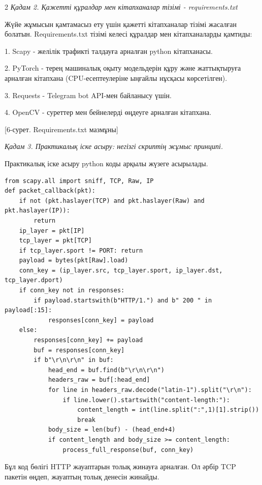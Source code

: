 \begin{multicols}{2}
\emph{Қадам 2. Қажетті құралдар мен кітапханалар тізімі -
requirements.txt}

Жүйе жұмысын қамтамасыз ету үшін қажетті кітапханалар тізімі жасалған
болатын. Requirements.txt тізімі келесі құралдар мен кітапханаларды
қамтиды:

1. Scapy - желілік трафикті талдауға арналған python кітапханасы.

2. PyTorch - терең машиналық оқыту модельдерін құру және жаттықтыруға
арналған кітапхана (CPU-есептеулеріне ыңғайлы нұсқасы көрсетілген).

3. Requests - Telegram bot API-мен байланысу үшін.

4. OpenCV - суреттер мен бейнелерді өңдеуге арналған кітапхана.
\end{multicols}

[6-сурет. Requirements.txt мазмұны]

\emph{Қадам 3. Практикалық іске асыру: негізгі скриптің жұмыс принципі.}

Практикалық іске асыру python коды арқылы жүзеге асырылады.

{\footnotesize
\begin{verbatim}
from scapy.all import sniff, TCP, Raw, IP
def packet_callback(pkt):
    if not (pkt.haslayer(TCP) and pkt.haslayer(Raw) and pkt.haslayer(IP)):
        return
    ip_layer = pkt[IP]
    tcp_layer = pkt[TCP]
    if tcp_layer.sport != PORT: return
    payload = bytes(pkt[Raw].load)
    conn_key = (ip_layer.src, tcp_layer.sport, ip_layer.dst, tcp_layer.dport)
    if conn_key not in responses:
        if payload.startswith(b"HTTP/1.") and b" 200 " in payload[:15]:
            responses[conn_key] = payload
    else:
        responses[conn_key] += payload
        buf = responses[conn_key]
        if b"\r\n\r\n" in buf:
            head_end = buf.find(b"\r\n\r\n")
            headers_raw = buf[:head_end]
            for line in headers_raw.decode("latin-1").split("\r\n"):
                if line.lower().startswith("content-length:"):
                    content_length = int(line.split(":",1)[1].strip())
                    break
            body_size = len(buf) - (head_end+4)
            if content_length and body_size >= content_length:
                process_full_response(buf, conn_key)
\end{verbatim}
}

Бұл код бөлігі HTTP жауаптарын толық жинауға арналған. Ол әрбір TCP
пакетін өңдеп, жауаптың толық денесін жинайды.

